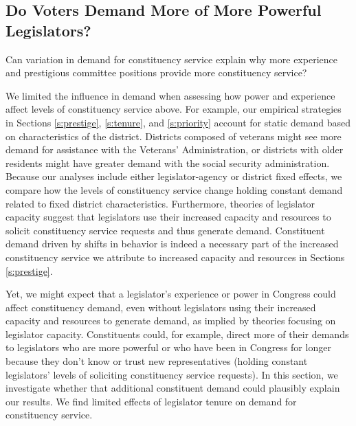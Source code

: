 \documentclass[12pt]{article}
\begin{document}


\subsection{Do Voters Demand More of More Powerful Legislators?}

Can variation in demand for constituency service explain why more experience and prestigious committee positions provide more constituency service? 

We limited the influence in demand when assessing how power and experience affect levels of constituency service above. For example, our empirical strategies in Sections \ref{s:prestige}, \ref{s:tenure}, and \ref{s:priority} account for static demand based on characteristics of the district. Districts composed of veterans might see more demand for assistance with the Veterans' Administration, or districts with older residents might have greater demand with the social security administration. Because our analyses include either legislator-agency or district fixed effects, we compare how the levels of constituency service change holding constant demand related to fixed district characteristics. Furthermore, theories of legislator capacity suggest that legislators use their increased capacity and resources to solicit constituency service requests and thus generate demand. Constituent demand driven by shifts in behavior is indeed a necessary part of the increased constituency service we attribute to increased capacity and resources in Sections \ref{s:prestige}.

Yet, we might expect that a legislator's experience or power in Congress could affect constituency demand, even without legislators using their increased capacity and resources to generate demand, as implied by theories focusing on legislator capacity. Constituents could, for example, direct more of their demands to legislators who are more powerful or who have been in Congress for longer because they don't know or trust new representatives (holding constant legislators' levels of soliciting constituency service requests). In this section, we investigate whether that additional constituent demand could plausibly explain our results. We find limited effects of legislator tenure on demand for constituency service. 
\end{document}
